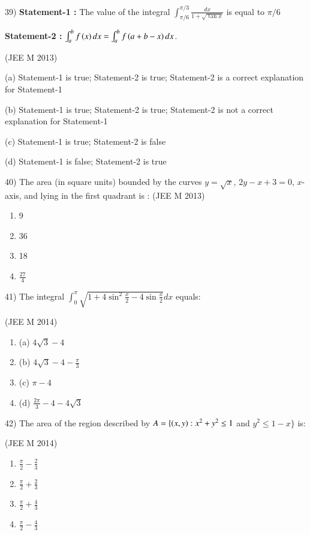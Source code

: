 \documentclass[journal,12pt,twocolumn]{IEEEtran}
\theoremstyle{remark}
\begin{document}
39)
	 \textbf{Statement-1 :} The value of the integral $\int_{\pi/6}^{\pi/3}\frac{dx}{1+\sqrt{\tan x}}$ is equal to $\pi/6$

		\textbf{Statement-2 :} $\int_a^bf\left(x\right)dx=\int_a^bf\left(a+b-x\right)dx$.

		\hfill{(JEE M 2013)}
		
		(a) Statement-1 is true; Statement-2 is true; Statement-2 is a correct explanation for Statement-1

		(b) Statement-1 is true; Statement-2 is true; Statement-2 is not a correct explanation for Statement-1

		(c) Statement-1 is true; Statement-2 is false

		(d) Statement-1 is false; Statement-2 is true

40)
	 The area (in square units) bounded by the curves $y=\sqrt{x}$, $2y-x+3=0$, $x$-axis, and lying in the first quadrant is :
		\hfill{(JEE M 2013)}

		\begin{multicols}{4}
			\begin{enumerate}
		\item 9
		\item 36
		\item 18
		\item $\frac{27}{4}$
			\end{enumerate}
		\end{multicols}


41)
	 The integral $\int_0^{\pi}\sqrt{1+4\sin ^2\frac{x}{2}-4\sin \frac{x}{2}}dx$ equals:

		\hfill{(JEE M 2014)}

		\begin{multicols}{2}
			\begin{enumerate}
				\item (a) $4\sqrt{3}-4$
				\item (b) $4\sqrt{3}-4-\frac{\pi}{3}$
				\item (c) $\pi-4$
				\item (d) $\frac{2\pi}{3}-4-4\sqrt{3}$
			\end{enumerate}
		\end{multicols}

42)
	 The area of the region described by $A=\{\left(x,y\right):x^2+y^2\leq1$ and $y^2\leq1-x\}$ is:

		\hfill{(JEE M 2014)}

		\begin{multicols}{4}
			\begin{enumerate}
				\item $\frac{\pi}{2}-\frac{2}{3}$
				\item $\frac{\pi}{2}+\frac{2}{3}$
				\item $\frac{\pi}{2}+\frac{4}{3}$
				\item $\frac{\pi}{2}-\frac{4}{3}$
			\end{enumerate}
		\end{multicols}
\end{document}
